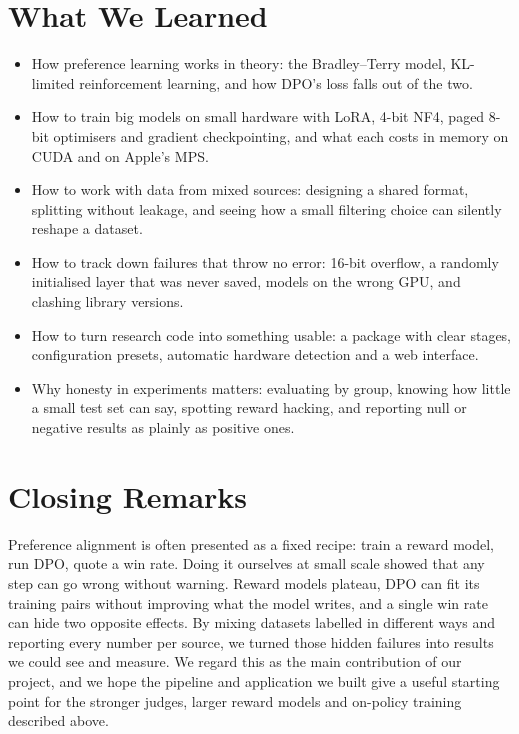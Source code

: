 \section{What We Learned}
\label{sec:learning}

\begin{itemize}
  \item How preference learning works in theory: the Bradley--Terry model, KL-limited reinforcement learning, and how DPO's loss falls out of the two.
  \item How to train big models on small hardware with LoRA, 4-bit NF4, paged 8-bit optimisers and gradient checkpointing, and what each costs in memory on CUDA and on Apple's MPS.
  \item How to work with data from mixed sources: designing a shared format, splitting without leakage, and seeing how a small filtering choice can silently reshape a dataset.
  \item How to track down failures that throw no error: 16-bit overflow, a randomly initialised layer that was never saved, models on the wrong GPU, and clashing library versions.
  \item How to turn research code into something usable: a package with clear stages, configuration presets, automatic hardware detection and a web interface.
  \item Why honesty in experiments matters: evaluating by group, knowing how little a small test set can say, spotting reward hacking, and reporting null or negative results as plainly as positive ones.
\end{itemize}

\section{Closing Remarks}
Preference alignment is often presented as a fixed recipe: train a reward model, run DPO, quote a win rate. Doing it ourselves at small scale showed that any step can go wrong without warning. Reward models plateau, DPO can fit its training pairs without improving what the model writes, and a single win rate can hide two opposite effects. By mixing datasets labelled in different ways and reporting every number per source, we turned those hidden failures into results we could see and measure. We regard this as the main contribution of our project, and we hope the pipeline and application we built give a useful starting point for the stronger judges, larger reward models and on-policy training described above.
